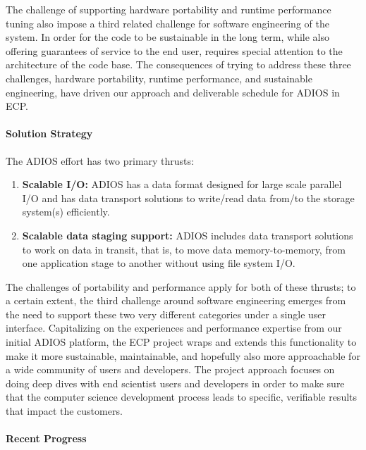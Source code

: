 The challenge of supporting hardware portability and runtime performance tuning also impose a third related challenge for software engineering of the system.  In order for the code to be sustainable in the long term, while also offering guarantees of service to the end user, requires special attention to the architecture of the code base.  The consequences of trying to address these three challenges, hardware portability, runtime performance, and sustainable engineering, have driven our approach and deliverable schedule for ADIOS in ECP.

\paragraph{Solution Strategy}

The ADIOS effort has two primary thrusts:
\begin{enumerate}
	\item \textbf{Scalable I/O:} ADIOS has a data format designed for large scale parallel I/O and has data transport solutions to write/read data from/to the storage system(s) efficiently.
	\item \textbf{Scalable data staging support:}  ADIOS includes data transport solutions to work on data in transit, that is, to move data memory-to-memory, from one application stage to another without using file system I/O.
\end{enumerate}

The challenges of portability and performance apply for both of these thrusts; to a certain extent, the third challenge around software engineering emerges from the need to support these two very different categories under a single user interface.  Capitalizing on the experiences and performance expertise from our initial ADIOS platform, the ECP project wraps and extends this functionality to make it more sustainable, maintainable, and hopefully also more approachable for a wide community of users and developers.  The project approach focuses on doing deep dives with end scientist users and developers in order to make sure that the computer science development process leads to specific, verifiable results that impact the customers.


\paragraph{Recent Progress}

